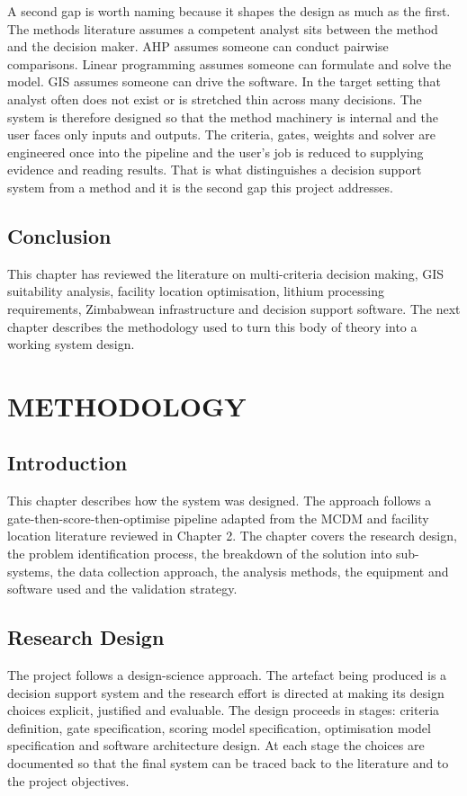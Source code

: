 \documentclass[12pt,a4paper]{report}
\begin{document}
A second gap is worth naming because it shapes the design as much as
the first. The methods literature assumes a competent analyst sits
between the method and the decision maker. AHP assumes someone can
conduct pairwise comparisons. Linear programming assumes someone can
formulate and solve the model. GIS assumes someone can drive the
software. In the target setting that analyst often does not exist or
is stretched thin across many decisions. The system is therefore
designed so that the method machinery is internal and the user faces
only inputs and outputs. The criteria, gates, weights and solver are
engineered once into the pipeline and the user's job is reduced to
supplying evidence and reading results. That is what distinguishes a
decision support system from a method and it is the second gap this
project addresses.

\section{Conclusion}
This chapter has reviewed the literature on multi-criteria decision
making, GIS suitability analysis, facility location optimisation,
lithium processing requirements, Zimbabwean infrastructure and
decision support software. The next chapter describes the methodology
used to turn this body of theory into a working system design.

\chapter{METHODOLOGY}

\section{Introduction}
This chapter describes how the system was designed. The approach
follows a gate-then-score-then-optimise pipeline adapted from the MCDM
and facility location literature reviewed in Chapter 2. The chapter
covers the research design, the problem identification process, the
breakdown of the solution into sub-systems, the data collection
approach, the analysis methods, the equipment and software used and
the validation strategy.

\section{Research Design}
The project follows a design-science approach. The artefact being
produced is a decision support system and the research effort is
directed at making its design choices explicit, justified and
evaluable. The design proceeds in stages: criteria definition, gate
specification, scoring model specification, optimisation model
specification and software architecture design. At each stage the
choices are documented so that the final system can be traced back to
the literature and to the project objectives.
\end{document}
